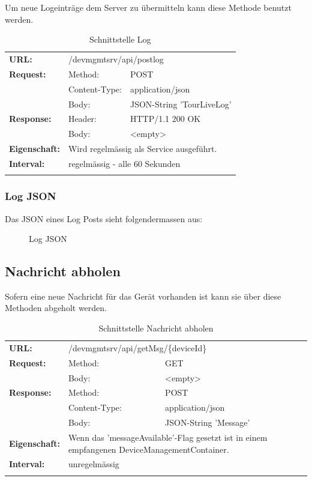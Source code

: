 Um neue Logeinträge dem Server zu übermitteln kann diese Methode benutzt werden.

{\renewcommand{\arraystretch}{1}
    \begin{longtable}{ p{2.5cm} p{3.5cm} p{6cm}}
	\textbf{URL:} & \multicolumn{2}{p{10cm}}{/devmgmtsrv/api/postlog} \\
	\textbf{Request:} & Method: & POST \\
		& Content-Type: & application/json \\
		& Body: & JSON-String 'TourLiveLog' \\
	\textbf{Response:} &  Header: & HTTP/1.1 200 OK \\
		& Body: & <empty>	\\
	\textbf{Eigenschaft:} &  \multicolumn{2}{p{10cm}}{Wird regelmässig als Service ausgeführt.}\\ 
	\textbf{Interval:} &  \multicolumn{2}{p{10cm}}{regelmässig - alle 60 Sekunden}\\
	
\caption{Schnittstelle Log}
\end{longtable}}

\subsubsection{Log JSON}

Das JSON eines Log Posts sieht folgendermassen aus:

\begin{figure}[H]
	\centering
	
	\caption{Log JSON}
\end{figure}

\subsection{Nachricht abholen}

Sofern eine neue Nachricht für das Gerät vorhanden ist kann sie über diese Methoden abgeholt werden.

{\renewcommand{\arraystretch}{1}
    \begin{longtable}{ p{2.5cm} p{3.5cm} p{6cm}}

	\textbf{URL:} & \multicolumn{2}{p{10cm}}{/devmgmtsrv/api/getMsg/\{deviceId\}} \\
	\textbf{Request:} & Method: & GET \\
		& Body: & <empty> \\
	\textbf{Response:} & Method: & POST \\
		& Content-Type: & application/json \\
		& Body: & JSON-String 'Message' \\
	\textbf{Eigenschaft:} & \multicolumn{2}{p{10cm}}{ Wenn das 'messageAvailable'-Flag gesetzt ist in einem empfangenen DeviceManagementContainer.} \\
	\textbf{Interval:} & \multicolumn{2}{p{10cm}}{unregelmässig}\\
	
\caption{Schnittstelle Nachricht abholen}
\end{longtable} }

